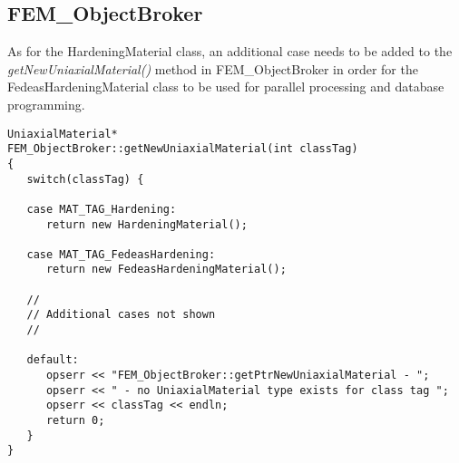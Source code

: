 \documentclass[12pt]{article}
\begin{document}
\subsection{FEM\_ObjectBroker}
As for the HardeningMaterial class, an additional case needs to be added to the
{\em getNewUniaxialMaterial()} method in FEM\_ObjectBroker in order for the
FedeasHardeningMaterial class to be used for parallel processing and database
programming.

{\sf\small
\begin{verbatim}
UniaxialMaterial*
FEM_ObjectBroker::getNewUniaxialMaterial(int classTag)
{
   switch(classTag) {

   case MAT_TAG_Hardening:
      return new HardeningMaterial();

   case MAT_TAG_FedeasHardening:
      return new FedeasHardeningMaterial();

   //
   // Additional cases not shown
   //

   default:
      opserr << "FEM_ObjectBroker::getPtrNewUniaxialMaterial - ";
      opserr << " - no UniaxialMaterial type exists for class tag ";
      opserr << classTag << endln;
      return 0;
   }        
}
\end{verbatim}
}
\end{document}
